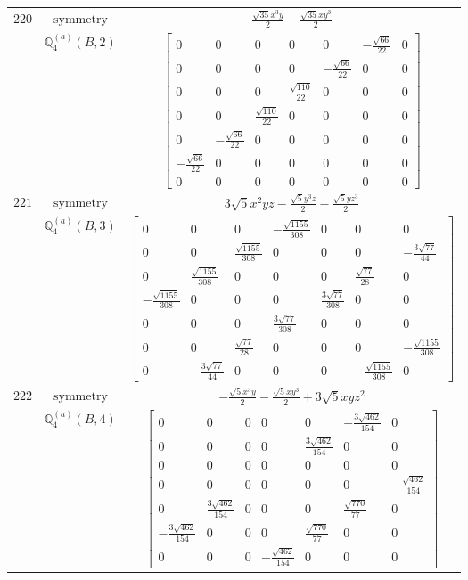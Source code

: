 \documentclass[fleqn,8pt,landscape]{jsarticle}
\begin{document}
\begin{longtable}{ccc}
$ 220 $ & $ \text{symmetry} $ & $ \frac{\sqrt{35} x^{3} y}{2} - \frac{\sqrt{35} x y^{3}}{2} $ \\
$  $ & $ \mathbb{Q}_{4}^{(a)}(B,2) $ & $ \begin{bmatrix} 0 & 0 & 0 & 0 & 0 & - \frac{\sqrt{66}}{22} & 0 \\ 0 & 0 & 0 & 0 & - \frac{\sqrt{66}}{22} & 0 & 0 \\ 0 & 0 & 0 & \frac{\sqrt{110}}{22} & 0 & 0 & 0 \\ 0 & 0 & \frac{\sqrt{110}}{22} & 0 & 0 & 0 & 0 \\ 0 & - \frac{\sqrt{66}}{22} & 0 & 0 & 0 & 0 & 0 \\ - \frac{\sqrt{66}}{22} & 0 & 0 & 0 & 0 & 0 & 0 \\ 0 & 0 & 0 & 0 & 0 & 0 & 0 \end{bmatrix} $ \\ \hline
$ 221 $ & $ \text{symmetry} $ & $ 3 \sqrt{5} x^{2} y z - \frac{\sqrt{5} y^{3} z}{2} - \frac{\sqrt{5} y z^{3}}{2} $ \\
$  $ & $ \mathbb{Q}_{4}^{(a)}(B,3) $ & $ \begin{bmatrix} 0 & 0 & 0 & - \frac{\sqrt{1155}}{308} & 0 & 0 & 0 \\ 0 & 0 & \frac{\sqrt{1155}}{308} & 0 & 0 & 0 & - \frac{3 \sqrt{77}}{44} \\ 0 & \frac{\sqrt{1155}}{308} & 0 & 0 & 0 & \frac{\sqrt{77}}{28} & 0 \\ - \frac{\sqrt{1155}}{308} & 0 & 0 & 0 & \frac{3 \sqrt{77}}{308} & 0 & 0 \\ 0 & 0 & 0 & \frac{3 \sqrt{77}}{308} & 0 & 0 & 0 \\ 0 & 0 & \frac{\sqrt{77}}{28} & 0 & 0 & 0 & - \frac{\sqrt{1155}}{308} \\ 0 & - \frac{3 \sqrt{77}}{44} & 0 & 0 & 0 & - \frac{\sqrt{1155}}{308} & 0 \end{bmatrix} $ \\ \hline
$ 222 $ & $ \text{symmetry} $ & $ - \frac{\sqrt{5} x^{3} y}{2} - \frac{\sqrt{5} x y^{3}}{2} + 3 \sqrt{5} x y z^{2} $ \\
$  $ & $ \mathbb{Q}_{4}^{(a)}(B,4) $ & $ \begin{bmatrix} 0 & 0 & 0 & 0 & 0 & - \frac{3 \sqrt{462}}{154} & 0 \\ 0 & 0 & 0 & 0 & \frac{3 \sqrt{462}}{154} & 0 & 0 \\ 0 & 0 & 0 & 0 & 0 & 0 & 0 \\ 0 & 0 & 0 & 0 & 0 & 0 & - \frac{\sqrt{462}}{154} \\ 0 & \frac{3 \sqrt{462}}{154} & 0 & 0 & 0 & \frac{\sqrt{770}}{77} & 0 \\ - \frac{3 \sqrt{462}}{154} & 0 & 0 & 0 & \frac{\sqrt{770}}{77} & 0 & 0 \\ 0 & 0 & 0 & - \frac{\sqrt{462}}{154} & 0 & 0 & 0 \end{bmatrix} $ \\ \hline

\end{longtable}
\end{document}

